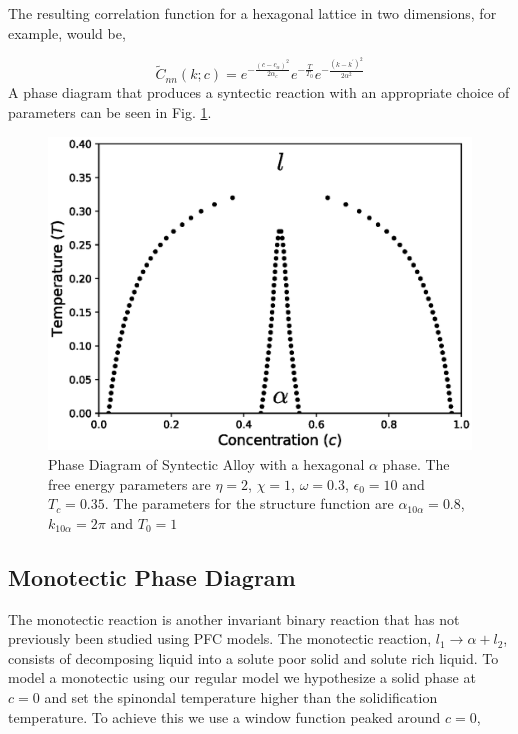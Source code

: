 \documentclass[showkeys, prb, reprint]{revtex4-1}
\newcommand{\f}{\frac}
\begin{document}
The resulting correlation function for a hexagonal lattice in two dimensions, for example, would be,

\begin{equation}
  \tilde{C}_{nn}(k; c) = e^{-\f{(c - c_\alpha)^2}{2 \alpha_c}} e^{-\f{T}{T_0}} e^{-\f{(k - k^\prime)^2}{2\alpha^2}}
\end{equation}
A phase diagram that produces a syntectic reaction with an appropriate choice of parameters can be seen in Fig. \ref{syntectic}.

\begin{figure}
	\includegraphics[scale=0.5]{syntectic.eps}
	\caption{\label{syntectic} Phase Diagram of Syntectic Alloy with a hexagonal $\alpha$ phase. The free energy parameters are $\eta=2$, $\chi=1$, $\omega=0.3$, $\epsilon_0 = 10$ and $T_c=0.35$. The parameters for the structure function are $\alpha_{10\alpha} = 0.8$, $k_{10\alpha} = 2\pi$ and $T_0 = 1$}
\end{figure}

\subsection{Monotectic Phase Diagram}

The monotectic reaction is another invariant binary reaction that has not previously been studied using PFC models. The monotectic reaction, $l_1 \rightarrow \alpha + l_2$, consists of decomposing liquid into a solute poor solid and solute rich liquid. To model a monotectic using our regular model we hypothesize a solid phase at $c=0$ and set the spinondal temperature higher than the solidification temperature. To achieve this we use a window function peaked around $c = 0$,
\end{document}
